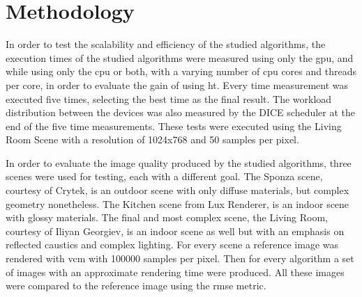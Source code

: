 \section{Methodology}

In order to test the scalability and efficiency of the studied algorithms, the execution times of the studied algorithms were measured using only the \gls{gpu}, and while using only the \gls{cpu} or both, with a varying number of \gls{cpu} cores and threads per core, in order to evaluate the gain of using \gls{ht}. Every time measurement was executed five times, selecting the best time as the final result. The workload distribution between the devices was also measured by the DICE scheduler at the end of the five time measurements. These tests were executed using the Living Room Scene with a resolution of 1024x768 and 50 samples per pixel.

In order to evaluate the image quality produced by the studied algorithms, three scenes were used for testing, each with a different goal. The Sponza scene, courtesy of Crytek, is an outdoor scene with only diffuse materials, but complex geometry nonetheless. The Kitchen scene from Lux Renderer, is an indoor scene with glossy materials. The final and most complex scene, the Living Room, courtesy of Iliyan Georgiev, is an indoor scene as well but with an emphasis on reflected caustics and complex lighting. For every scene a reference image was rendered with \gls{vcm} with 100000 samples per pixel. Then for every algorithm a set of images with an approximate rendering time were produced. All these images were compared to the reference image using the \gls{rmse} metric.

